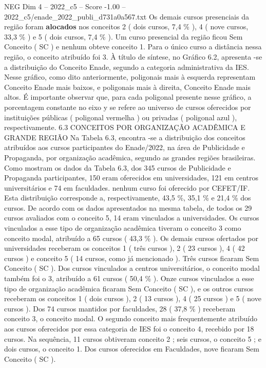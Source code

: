\begin{textsample}{NEG Dim 4 – 2022\_c5 – Score -1.00 – 2022\_c5/enade\_2022\_publi\_d731a0a567.txt}
Os demais cursos presenciais da região foram \textbf{alocados} nos conceitos 2 ( dois cursos, 7,4 \% ), 4 ( nove cursos, 33,3 \% ) e 5 ( dois cursos, 7,4 \% ).
Um curso presencial da região ficou Sem Conceito ( SC ) e nenhum obteve conceito 1.
Para o único curso a distância nessa região, o conceito atribuído foi 3.
À título de síntese, no Gráfico 6.2, apresenta -se a distribuição do Conceito Enade, segundo a categoria administrativa da IES.
Nesse gráfico, como dito anteriormente, poligonais mais à esquerda representam Conceito Enade mais baixos, e poligonais mais à direita, Conceito Enade mais altos.
É importante observar que, para cada poligonal presente nesse gráfico, a porcentagem constante no eixo y se refere ao universo de cursos oferecidos por instituições públicas ( poligonal vermelha ) ou privadas ( poligonal azul ), respectivamente. 6.3 CONCEITOS POR ORGANIZAÇÃO ACADÊMICA E GRANDE REGIÃO Na Tabela 6.3, encontra -se a distribuição dos conceitos atribuídos aos cursos participantes do Enade/2022, na área de Publicidade e Propaganda, por organização acadêmica, segundo as grandes regiões brasileiras.
Como mostram os dados da Tabela 6.3, dos 345 cursos de Publicidade e Propaganda participantes, 150 eram oferecidos em universidades, 121 em centros universitários e 74 em faculdades. nenhum curso foi oferecido por CEFET/IF.
Esta distribuição corresponde a, respectivamente, 43,5 \%, 35,1 \% e 21,4 \% dos cursos.
De acordo com os dados apresentados na mesma tabela, de todos os 29 cursos avaliados com o conceito 5, 14 eram vinculados a universidades.
Os cursos vinculados a esse tipo de organização acadêmica tiveram o conceito 3 como conceito modal, atribuído a 65 cursos ( 43,3 \% ).
Os demais cursos ofertados por universidades receberam os conceitos 1 ( três cursos ), 2 ( 23 cursos ), 4 ( 42 cursos ) e conceito 5 ( 14 cursos, como já mencionado ).
Três cursos ficaram Sem Conceito ( SC ).
Dos cursos vinculados a centros universitários, o conceito modal também foi o 3, atribuído a 61 cursos ( 50,4 \% ).
Onze cursos vinculados a esse tipo de organização acadêmica ficaram Sem Conceito ( SC ), e os outros cursos receberam os conceitos 1 ( dois cursos ), 2 ( 13 cursos ), 4 ( 25 cursos ) e 5 ( nove cursos ).
Dos 74 cursos mantidos por faculdades, 28 ( 37,8 \% ) receberam conceito 3, o conceito modal.
O segundo conceito mais frequentemente atribuído aos cursos oferecidos por essa categoria de IES foi o conceito 4, recebido por 18 cursos.
Na sequência, 11 cursos obtiveram conceito 2 ; seis cursos, o conceito 5 ; e dois cursos, o conceito 1.
Dos cursos oferecidos em Faculdades, nove ficaram Sem Conceito ( SC ).

\end{textsample}
